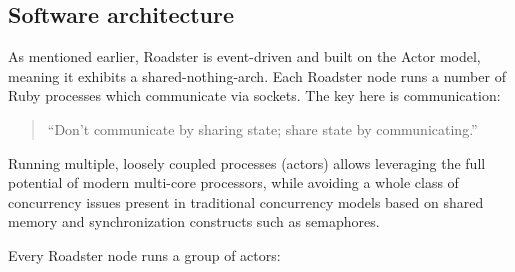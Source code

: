 \subsection{Software architecture}
As mentioned earlier, Roadster is \gls{event-driven} and built on the Actor model, meaning it exhibits a
\gls{shared-nothing-arch}. Each Roadster node runs a number of Ruby processes
which communicate via \zmq sockets. The key here is communication:

\begin{quote}
``Don't communicate by sharing state; share state by communicating.''
\end{quote}

Running multiple, loosely coupled processes (actors) allows leveraging the full
potential of modern multi-core processors, while avoiding a whole class of
concurrency issues present in traditional concurrency models based on shared
memory and synchronization constructs such as semaphores.

Every Roadster node runs a group of actors:

